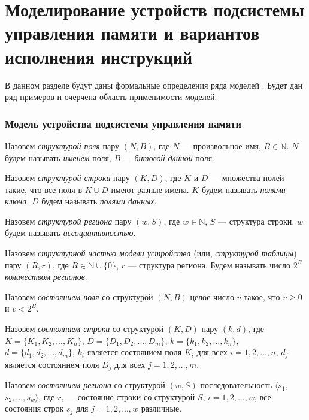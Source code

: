 \section{Моделирование устройств подсистемы \\управления памяти и вариантов исполнения инструкций}\label{sec:state_model_section}

В данном разделе будут даны формальные определения ряда моделей%
. Будет дан ряд примеров и очерчена область применимости моделей.

\subsubsection*{Модель устройства подсистемы управления памяти}


Назовем \emph{структурой поля} пару $(N, B)$, где $N$ --- произвольное имя, $B \in \mathbb{N}$. $N$ будем называть \emph{именем} поля, $B$ --- \emph{битовой длиной} поля.

Назовем \emph{структурой строки} пару $(K, D)$, где $K$ и $D$ --- множества полей такие, что все поля в $K \cup D$ имеют разные имена. $K$ будем называть \emph{полями ключа}, $D$ будем называть \emph{полями данных}.

Назовем \emph{структурой региона} пару $(w, S)$, где $w \in \mathbb{N}$, $S$ --- структура строки. $w$ будем называть \emph{ассоциативностью}.

Назовем \emph{структурной частью модели устройства} (или, \emph{структурой таблицы}) пару $(R, r)$, где $R \in \mathbb{N} \cup \{0\}$, $r$ --- структура региона. Будем называть число $2^R$ \emph{количеством регионов}.

Назовем \emph{состоянием поля} со структурой $(N, B)$ целое число $v$ такое, что $v \geqslant 0$ и $v < 2^B$.

Назовем \emph{состоянием строки} со структурой $(K, D)$ пару $(k, d)$, где $K = \{K_1, K_2, ..., K_n\}$, $D = \{D_1, D_2, ..., D_m\}$, $k = \{k_1, k_2, ..., k_n\}$, $d = \{d_1, d_2, ..., d_m\}$, $k_i$ является состоянием поля $K_i$ для всех $i = 1, 2, ..., n$, $d_j$ является состоянием поля $D_j$ для всех $j = 1, 2, ..., m$.

Назовем \emph{состоянием региона} со структурой $(w, S)$ последовательность $\langle s_1,$ $s_2, ..., s_w\rangle$, где $r_i$ --- состояние строки со структурой $S$, $i = 1, 2, ..., w$, все состояния строк $s_j$ для $j = 1, 2, ..., w$ различные.

